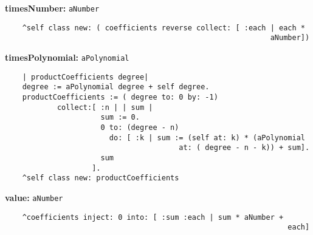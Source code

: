 {\bf timesNumber:} {\tt aNumber}
\begin{verbatim}
    ^self class new: ( coefficients reverse collect: [ :each | each * 
                                                             aNumber])

\end{verbatim}
{\bf timesPolynomial:} {\tt aPolynomial}
\begin{verbatim}
    | productCoefficients degree|
    degree := aPolynomial degree + self degree.
    productCoefficients := ( degree to: 0 by: -1)
            collect:[ :n | | sum |
                      sum := 0.
                      0 to: (degree - n)
                        do: [ :k | sum := (self at: k) * (aPolynomial 
                                        at: ( degree - n - k)) + sum].
                      sum
                    ].
    ^self class new: productCoefficients

\end{verbatim}
{\bf value:} {\tt aNumber}
\begin{verbatim}
    ^coefficients inject: 0 into: [ :sum :each | sum * aNumber + 
                                                                 each]

\end{verbatim}

